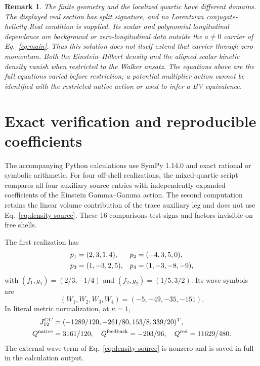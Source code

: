 \documentclass[11pt]{article}
\newtheorem{remark}{Remark}
\begin{document}
\begin{remark}
The finite geometry and the localized quartic have different domains.
The displayed real section has split signature, and no Lorentzian conjugate-helicity Real condition is supplied.
Its scalar and polynomial longitudinal dependence are background or zero-longitudinal data outside the \(a\ne0\) carrier of Eq.~\eqref{eq:main}.
Thus this solution does not itself extend that carrier through zero momentum.
Both the Einstein--Hilbert density and the aligned scalar kinetic density vanish when restricted to the Walker ansatz.
The equations above are the full equations varied before restriction; a potential multiplier action cannot be identified with the restricted native action or used to infer a BV equivalence.
\end{remark}

\section{Exact verification and reproducible coefficients}

The accompanying Python calculations use SymPy 1.14.0 and exact rational or symbolic arithmetic.
For four off-shell realizations, the mixed-quartic script compares all four auxiliary source entries with independently expanded coefficients of the Einstein Gamma--Gamma action.
The second computation retains the linear volume contribution of the trace auxiliary leg and does not use Eq.~\eqref{eq:density-source}.
These 16 comparisons test signs and factors invisible on free shells.

The first realization has
\begin{align}
 p_1&=(2,3,1,4),&p_2&=(-4,3,5,0),\notag\\
 p_3&=(1,-3,2,5),&p_4&=(1,-3,-8,-9),
 \label{eq:example-p}
\end{align}
with \((f_1,g_1)=(2/3,-1/4)\) and \((f_2,g_2)=(1/5,3/2)\).
Its wave symbols are
\begin{equation}
 (W_1,W_2,W_3,W_4)=(-5,-49,-35,-151).
 \label{eq:example-w}
\end{equation}
In literal metric normalization, at \(\kappa=1\),
\begin{align}
 J^{CC}_{12}&=(-1289/120,-261/80,153/8,339/20)^T,\notag\\
 Q^{\rm native}&=3161/120,\quad Q^{\rm feedback}=-203/96,\quad
 Q^{\rm red}=11629/480.
 \label{eq:example-result}
\end{align}
The external-wave term of Eq.~\eqref{eq:density-source} is nonzero and is saved in full in the calculation output.
\end{document}
